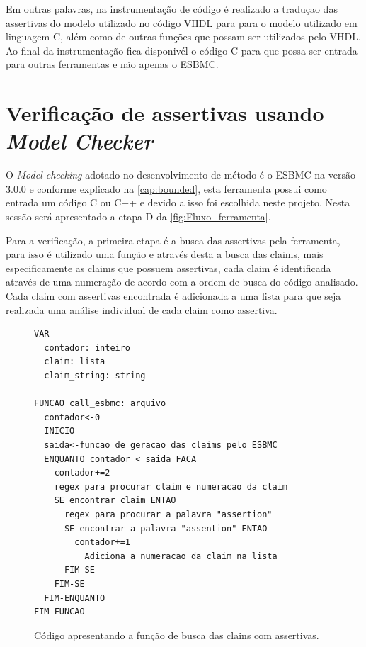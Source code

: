 \par
Em outras palavras, na instrumentação de código é realizado a traduçao das assertivas do modelo utilizado no código VHDL para para o modelo utilizado em linguagem C, além como de outras funções que possam ser utilizados pelo VHDL. Ao final da instrumentação fica disponivél o código C para que possa ser entrada para outras ferramentas e não apenas o ESBMC.

\section{Verificação de assertivas usando \textit{Model Checker}}
\par
O \textit{Model checking} adotado no desenvolvimento de método é o ESBMC na versão 3.0.0 e conforme explicado na \autoref{cap:bounded}, esta ferramenta possui como entrada um código C ou C++ e devido a isso foi escolhida neste projeto. Nesta sessão será apresentado a etapa D da \autoref{fig:Fluxo_ferramenta}.

\par
Para a verificação, a primeira etapa é a busca das assertivas pela ferramenta, para isso é utilizado uma função e através desta a busca das claims, mais especificamente as claims que possuem assertivas, cada claim é identificada através de uma numeração de acordo com a ordem de busca do código analisado. Cada claim com assertivas encontrada é adicionada a uma lista para que seja realizada uma análise individual de cada claim como assertiva.

\begin{figure}[H]
\caption{\label{fig:codigo_claims} Código apresentando a função de busca das clains com assertivas.}
	\begin{center}
    \begin{minipage}{0.99\textwidth}
    \begin{lstlisting}       
VAR
  contador: inteiro
  claim: lista
  claim_string: string 

FUNCAO call_esbmc: arquivo
  contador<-0
  INICIO
  saida<-funcao de geracao das claims pelo ESBMC
  ENQUANTO contador < saida FACA
    contador+=2
    regex para procurar claim e numeracao da claim
    SE encontrar claim ENTAO
      regex para procurar a palavra "assertion"
      SE encontrar a palavra "assention" ENTAO
        contador+=1
	      Adiciona a numeracao da claim na lista
      FIM-SE
    FIM-SE
  FIM-ENQUANTO
FIM-FUNCAO
    \end{lstlisting}
    \end{minipage}
	\end{center}
\end{figure}

